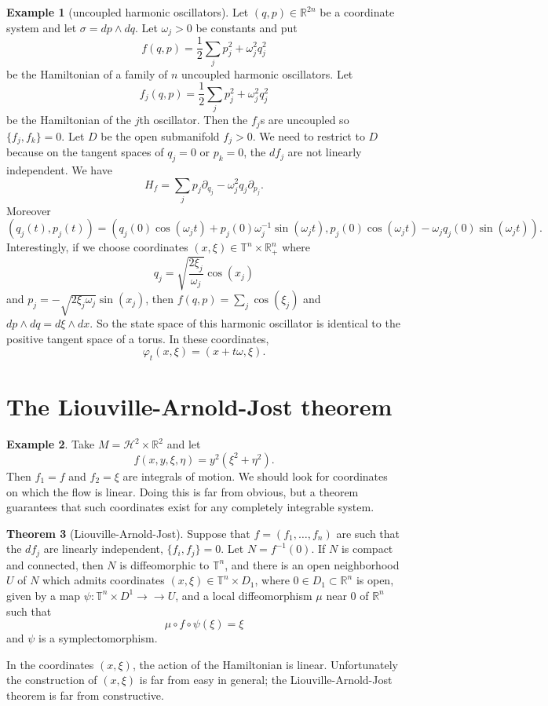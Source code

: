 \documentclass[12pt]{report}
\newcommand{\RR}{\mathbb{R}}
\newcommand{\TT}{\mathbb{T}}
\newcommand{\HH}{\mathcal H}
\theoremstyle{definition}
\newtheorem{theorem}{Theorem}[chapter]
\newtheorem{example}[theorem]{Example}
\begin{document}
\begin{example}[uncoupled harmonic oscillators]
Let $(q, p) \in \RR^{2n}$ be a coordinate system and let $\sigma = dp \wedge dq$. Let $\omega_j > 0$ be constants and put
$$f(q, p)  = \frac{1}{2} \sum_j p_j^2 + \omega_j^2 q_j^2$$
be the Hamiltonian of a family of $n$ uncoupled harmonic oscillators. Let
$$f_j(q, p) = \frac{1}{2} \sum_j p_j^2 + \omega_j^2 q_j^2$$
be the Hamiltonian of the $j$th oscillator. Then the $f_j$s are uncoupled so $\{f_j, f_k\} = 0$. Let $D$ be the open submanifold $f_j > 0$.
We need to restrict to $D$ because on the tangent spaces of $q_j = 0$ or $p_k = 0$, the $df_j$ are not linearly independent.
We have
$$H_f = \sum_j p_j \partial_{q_j} - \omega_j^2q_j\partial_{p_j}.$$
Moreover
$$(q_j(t), p_j(t)) = (q_j(0)\cos(\omega_jt) + p_j(0)\omega_j^{-1}\sin(\omega_jt), p_j(0)\cos(\omega_jt) - \omega_j q_j(0)\sin(\omega_jt)).$$
Interestingly, if we choose coordinates $(x, \xi) \in \TT^n \times \RR^n_+$ where
$$q_j = \sqrt{\frac{2\xi_j}{\omega_j}}\cos(x_j)$$
and $p_j = -\sqrt{2\xi_j\omega_j}\sin(x_j)$, then $f(q, p) = \sum_j\cos(\xi_j)$ and $dp \wedge dq = d\xi \wedge dx$. So the state space of this harmonic oscillator is identical to the positive tangent space of a torus.
In these coordinates,
$$\varphi_t(x, \xi) = (x + t\omega, \xi).$$
\end{example}

\section{The Liouville-Arnold-Jost theorem}
\begin{example}
Take $M = \HH^2 \times \RR^2$ and let
$$f(x, y, \xi, \eta) = y^2(\xi^2 + \eta^2).$$
Then $f_1 = f$ and $f_2 = \xi$ are integrals of motion. We should look for coordinates on which the flow is linear. Doing this is far from obvious, but a theorem guarantees that such coordinates exist for any completely integrable system.
\end{example}

\begin{theorem}[Liouville-Arnold-Jost]
Suppose that $f = (f_1, \dots, f_n)$ are such that the $df_j$ are linearly independent, $\{f_i, f_j\} = 0$. Let $N = f^{-1}(0)$. If $N$ is compact and connected, then $N $ is diffeomorphic to $\TT^n$, and there is an open neighborhood $U$ of $N$ which admits coordinates $(x, \xi) \in \TT^n \times D_1$, where $0 \in D_1 \subset \RR^n$ is open,
given by a map $\psi: \TT^n \times D^1 \to \to U$, and a local diffeomorphism $\mu$ near $0$ of $\RR^n$ such that
$$\mu \circ f \circ \psi(\xi) = \xi$$
and $\psi$ is a symplectomorphism.
\end{theorem}
In the coordinates $(x, \xi)$, the action of the Hamiltonian is linear. Unfortunately the construction of $(x, \xi)$ is far from easy in general; the Liouville-Arnold-Jost theorem is far from constructive.
\end{document}
